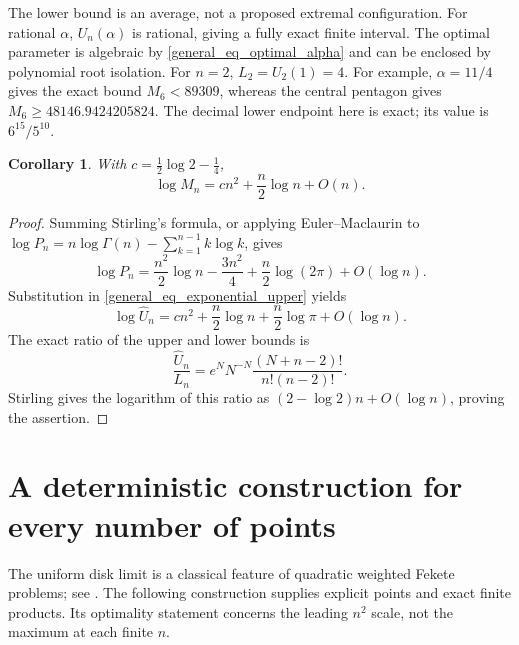 \documentclass[11pt]{article}
\newtheorem{corollary}[theorem]{Corollary}
\theoremstyle{remark}
\numberwithin{equation}{section}
\begin{document}
The lower bound is an average, not a proposed extremal configuration.
For rational $\alpha$, $U_n(\alpha)$ is rational, giving a fully exact
finite interval. The optimal parameter is algebraic by
\eqref{general_eq_optimal_alpha} and can be enclosed by polynomial
root isolation. For $n=2$, $L_2=U_2(1)=4$.
For example, $\alpha=11/4$ gives the exact bound $M_6<89309$, whereas
the central pentagon gives $M_6\ge48146.9424205824$.
The decimal lower endpoint here is exact; its value is $6^{15}/5^{10}$.

\begin{corollary}\label{general_cor_asymptotic}
With $c=\tfrac12\log2-\tfrac14$,
\begin{equation}\label{general_eq_asymptotic}
 \log M_n=cn^2+\frac n2\log n+O(n).
\end{equation}
\end{corollary}
\begin{proof}
Summing Stirling's formula, or applying Euler--Maclaurin to
$\log P_n=n\log\Gamma(n)-\sum_{k=1}^{n-1}k\log k$, gives
\[
 \log P_n=\frac{n^2}{2}\log n-\frac{3n^2}{4}
            +\frac n2\log(2\pi)+O(\log n).
\]
Substitution in \eqref{general_eq_exponential_upper} yields
\[
 \log\widehat U_n=cn^2+\frac n2\log n
                      +\frac n2\log\pi+O(\log n).
\]
The exact ratio of the upper and lower bounds is
\[
 \frac{\widehat U_n}{L_n}
 =e^NN^{-N}\frac{(N+n-2)!}{n!(n-2)!}.
\]
Stirling gives the logarithm of this ratio as
$(2-\log2)n+O(\log n)$, proving the assertion.
\end{proof}

\section{A deterministic construction for every number of points}
\label{general_sec_lattice}
The uniform disk limit is a classical feature of quadratic weighted
Fekete problems; see \cite{AOC,SS}. The following construction supplies
explicit points and exact finite products. Its optimality statement
concerns the leading $n^2$ scale, not the maximum at each finite $n$.
\end{document}
